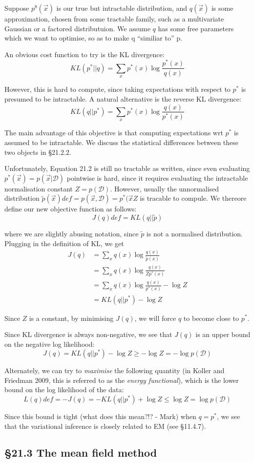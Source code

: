 \documentclass{amsart}
\begin{document}
Suppose $p^{8}(\vec{x})$ is our true but intractable distribution, and $q(\vec{x})$ is some 
approximation, chosen from some tractable family, such as a multivariate Gaussian or a
factored distributuion. We assume $q$ has some free parameters which we want to optimise,
so as to make q ``similiar to'' p.

An obvious cost function to try is the KL divergence:
\[
	KL(p^{*}||q) = \sum_x p^{*}(x) \log{\frac{p^{*}(x)}{q(x)}}
\]

However, this is hard to compute, since taking expectations with respect to $p^{*}$ is
presumed to be intractable. A natural alternative is the reverse KL divergence:
\[
	KL(q||p^{*}) = \sum_x p^{*}(x) \log{\frac{q(x)}{p^{*}(x)}}
\]

The main advantage of this objective is that computing expectations wrt $p^{*}$ is assumed
to be intractable. We discuss the statistical differences between these two objects in
\S 21.2.2. %

Unfortunately, Equation 21.2 is still no tractable as written, since even evaluating
$p^{*}(\vec{x}) = p(\vec{x} | \mathcal{D})$ pointwise is hard, since it requires evaluating
the intractable normalisation constant $Z=p(\mathcal{D})$. However, usually the unnormalised
distribution $\tilde{p}(\vec{x}) def = p(\vec{x}, \mathcal{D}) = p^{*}(\vec{x} Z$ is
tracable to compule. We thereore define our new objective function as follows:
\[
J(q) def = KL(q||\tilde{p})
\]

where we are slightly abusing notation, since $\tilde{p}$ is not a normalised distribution.
Plugging in the definition of KL, we get
\begin{align*}
J(q) &= \sum_x q(x) \log{\frac{q(x)}{\tilde{p}(x)}} \\
&= \sum_x q(x) \log{\frac{q(x)}{Z p^{*}(x)}} \\
&= \sum_x q(x) \log{\frac{q(x)}{p^{*}(x)}} - \log{Z} \\
&= KL(q || p^{*}) - \log{Z}
\end{align*}

Since $Z$ is a constant, by minimising $J(q)$, we will force $q$ to become close to
$p^{*}$.

Since KL divergence is always non-negative, we see that $J(q)$ is an upper bound on the
negative log likelihood:
\[
J(q) = KL(q||p^{*}) - \log{Z} \geq -\log{Z} = -\log{p(\mathcal{D})}
\]

Alternately, we can try to \emph{maximise} the following quantity (in Koller and Friedman
2009, this is referred to as the \emph{energy functional}), which is the lower bound on
the log likelihood of the data:
\[
L(q) def = -J(q) = -KL(q||p^{*}) + \log{Z} \leq \log{Z} = \log{p(\mathcal{D})}
\]

Since this bound is tight (what does this mean?!? - Mark) when $q=p^{*}$, we see that the
variational inference is closely related to EM (see \S 11.4.7).

\subsection{\S 21.3 The mean field method}
\end{document}
